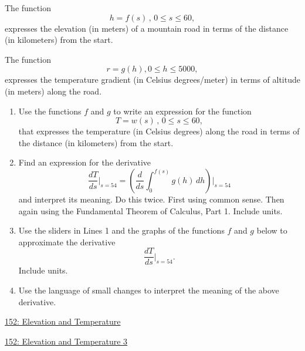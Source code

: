 \documentclass{ximera}
\begin{document}
\begin{question}  \label{Q9erKKe33399}
The function
\[
   h = f(s) \, , \, 0\leq s \leq 60 ,
\]
expresses the elevation (in meters) of a mountain road in terms of the distance (in kilometers) from the start.

The function 
\[
    r = g(h) , 0\leq h \leq 5000 ,
\] 
expresses the temperature gradient (in Celsius degrees/meter) in terms of altitude (in meters) along the road.

\begin{enumerate}
\item Use the functions $f$ and $g$ to write an expression for the function
\[
 T = w(s) \, , \, 0\leq s \leq 60 ,
\]
that expresses the temperature (in Celsius degrees) along the road in terms of the distance (in kilometers) from the start.

\item Find an expression for the derivative
\[
   \frac{dT}{ds}\Big|_{s=54} =  \left(  \frac{d}{ds} \int_0^{f(s)} g(h)\, dh       \right)\Big| _{s=54}
\]
and interpret its meaning. Do this twice. First using common sense. Then again using the Fundamental Theorem of Calculus, Part 1. Include units.


\item Use the sliders in Lines 1 and the graphs of the functions $f$ and $g$ below to approximate the derivative
\[
   \frac{dT}{ds}\Big|_{s=54} .
\]
Include units.

\item Use the language of small changes to interpret the meaning of the above derivative.
\end{enumerate}

\begin{onlineOnly}
    \begin{center}
\end{center}
\end{onlineOnly}

\href{https://www.desmos.com/calculator/gcmfa2a6jz}{152: Elevation and Temperature}

\begin{onlineOnly}
    \begin{center}
\end{center}
\end{onlineOnly}

\href{https://www.desmos.com/calculator/vvr0qrgoh1}{152: Elevation and Temperature 3}
\end{question}
\end{document}
